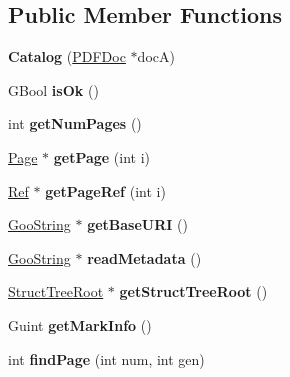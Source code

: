 \subsection*{Public Member Functions}
\begin{DoxyCompactItemize}
\item 
\mbox{\label{class_catalog_a2696daacb3c692a0a9a9d04ab6f4953b}} 
{\bfseries Catalog} (\hyperlink{class_p_d_f_doc}{P\+D\+F\+Doc} $\ast$docA)
\item 
\mbox{\label{class_catalog_ac67dea88b8202438575402936a903749}} 
G\+Bool {\bfseries is\+Ok} ()
\item 
\mbox{\label{class_catalog_a82d12a24ea602356b186e6e4d5ef3c2f}} 
int {\bfseries get\+Num\+Pages} ()
\item 
\mbox{\label{class_catalog_a80484d8cf381b96a80d95331dad7c3a4}} 
\hyperlink{class_page}{Page} $\ast$ {\bfseries get\+Page} (int i)
\item 
\mbox{\label{class_catalog_a1a1033ae26ce817d89eb27f17639f4fc}} 
\hyperlink{struct_ref}{Ref} $\ast$ {\bfseries get\+Page\+Ref} (int i)
\item 
\mbox{\label{class_catalog_a342a422c3a6e2fd2efebf2d18c30c575}} 
\hyperlink{class_goo_string}{Goo\+String} $\ast$ {\bfseries get\+Base\+U\+RI} ()
\item 
\mbox{\label{class_catalog_ace4f8fbc0c37eb1dd8ce2884d8490008}} 
\hyperlink{class_goo_string}{Goo\+String} $\ast$ {\bfseries read\+Metadata} ()
\item 
\mbox{\label{class_catalog_aba08c1e8c1b08ff76fca8df835d78a8f}} 
\hyperlink{class_struct_tree_root}{Struct\+Tree\+Root} $\ast$ {\bfseries get\+Struct\+Tree\+Root} ()
\item 
\mbox{\label{class_catalog_a2f62f7bfad942fdbdf7f0ae547f578ea}} 
Guint {\bfseries get\+Mark\+Info} ()
\item 
\mbox{\label{class_catalog_aeb22631bab68756be80a4babaa116a24}} 
int {\bfseries find\+Page} (int num, int gen)

\end{DoxyCompactItemize}
